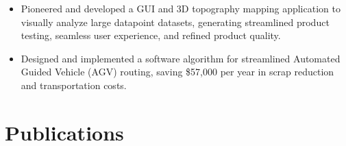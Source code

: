 \documentclass[11pt,a4paper,sans]{moderncv} %
\begin{document}

{
\begin{itemize}
	\item Pioneered and developed a GUI and 3D topography mapping application to visually analyze large datapoint datasets, generating streamlined product testing, seamless user experience, and refined product quality.
\end{itemize}
}

{
\begin{itemize}
	\item Designed and implemented a software algorithm for streamlined Automated Guided Vehicle (AGV) routing, saving \$57,000 per year in scrap reduction and transportation costs.
\end{itemize}
}

\section{Publications}

\begin{refsection}[conference]
	\nocite{*}
	\printbibliography[title={Conferences},heading=subbibliography]
\end{refsection}
\begin{refsection}[journal]
	\nocite{*}
	\printbibliography[title={Journals},heading=subbibliography]
\end{refsection}
\begin{refsection}[workshop]
	\nocite{*}
	\printbibliography[title={Workshops},heading=subbibliography]
\end{refsection}


\end{document}
